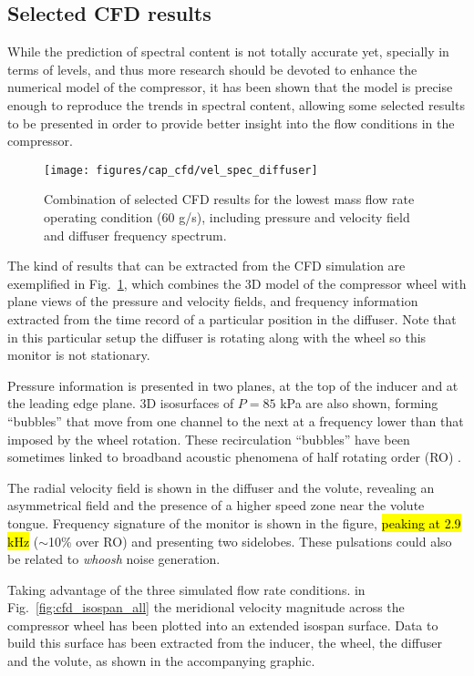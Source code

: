 \subsection{Selected CFD results}

While the prediction of spectral content is not totally accurate yet, specially in terms of levels, and thus more research should be devoted to enhance the numerical model of the compressor, it has been shown that the model is precise enough to reproduce the trends in spectral content, allowing some selected results to be presented in order to provide better insight into the flow conditions in the compressor.

\begin{figure}[htb!]
\centering
\texttt{[image: figures/cap\_cfd/vel\_spec\_diffuser]}
\caption{Combination of selected CFD results for the lowest mass flow rate operating condition (60 g/s), including pressure and velocity field and diffuser frequency spectrum.}
\label{fig:vel_spec_diffuser}
\end{figure}

The kind of results that can be extracted from the CFD simulation are exemplified in Fig.~\ref{fig:vel_spec_diffuser}, which combines the 3D model of the compressor wheel with plane views of the pressure and velocity fields, and frequency information extracted from the time record of a particular position in the diffuser. Note that in this particular setup the diffuser is rotating along with the wheel so this monitor is not stationary.

Pressure information is presented in two planes, at the top of the inducer and at the leading edge plane. 3D isosurfaces of $P = 85$ kPa are also shown, forming ``bubbles'' that move from one channel to the next at a frequency lower than that imposed by the wheel rotation. These recirculation ``bubbles'' have been sometimes linked to broadband acoustic phenomena of half rotating order (RO) \cite{sundstrom2015centrifugal,sundstrom2014assessment}.

The radial velocity field is shown in the diffuser and the volute, revealing an asymmetrical field and the presence of a higher speed zone near the volute tongue. Frequency signature of the monitor is shown in the figure, \hl{peaking at 2.9 kHz} ($\sim$10\% over RO) and presenting two sidelobes. These pulsations could also be related to \emph{whoosh} noise generation.

Taking advantage of the three simulated flow rate conditions. in Fig.~\ref{fig:cfd_isospan_all} the meridional velocity magnitude across the compressor wheel has been plotted into an extended isospan surface. Data to build this surface has been extracted from the inducer, the wheel, the diffuser and the volute, as shown in the accompanying graphic. 

